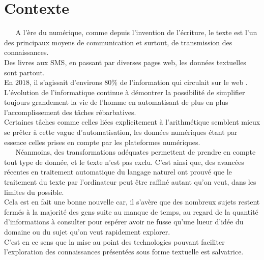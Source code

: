 \section{Contexte}
$ _{} $ $ _{} $ $ _{} $ $ _{} $ $ _{} $A l'ère du numérique, comme depuis l'invention de l'écriture, le texte est l'un des principaux moyens de communication et surtout, de transmission des connaissances.\\
Des livres aux SMS, en passant par diverses pages web, les données textuelles sont partout.\\
En $ 2018 $, il s'agissait d'environs $ 80\% $ de l'information qui circulait sur le web \cite{lamsiyah-etal-2018-resume}.\\
L'évolution de l'informatique continue à démontrer la possibilité de simplifier toujours grandement la vie de l'homme en automatisant de plus en plus l'accomplissement des tâches rébarbatives.\\
Certaines tâches comme celles liées explicitement à l'arithmétique semblent mieux se prêter à cette vague d'automatisation, les données numériques étant par essence celles prises en compte par les plateformes numériques.\\
$ _{} $ $ _{} $ $ _{} $ $ _{} $ $ _{} $Néanmoins, des transformations adéquates permettent de prendre en compte tout type de donnée, et le texte n'est pas exclu. C'est ainsi que, des avancées récentes en traitement automatique du langage naturel ont prouvé que le traitement du texte par l'ordinateur peut être raffiné autant qu'on veut, dans les limites du possible.\\
Cela est en fait une bonne nouvelle car, il s'avère que des nombreux sujets restent fermés à la majorité des gens suite au manque de temps, au regard de la quantité d'informations à consulter pour espérer avoir ne fusse qu'une lueur d'idée du domaine ou du sujet qu'on veut rapidement explorer.\\
C'est en ce sens que la mise au point des technologies pouvant faciliter l'exploration des connaissances présentées sous forme textuelle est salvatrice.
